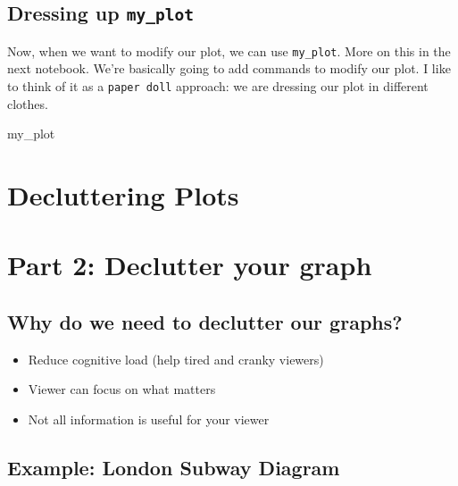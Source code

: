 \documentclass[
  letterpaper,
  DIV=11,
  numbers=noendperiod]{scrreprt}
\newenvironment{Shaded}{\begin{snugshade}}{\end{snugshade}}
\newcommand{\NormalTok}[1]{\textcolor[rgb]{0.00,0.23,0.31}{#1}}
\providecommand{\tightlist}{%
  \setlength{\itemsep}{0pt}\setlength{\parskip}{0pt}}\usepackage{longtable,booktabs,array}
\begin{document}
\section{\texorpdfstring{Dressing up
\texttt{my\_plot}}{Dressing up my\_plot}}\label{dressing-up-my_plot}

Now, when we want to modify our plot, we can use \texttt{my\_plot}. More
on this in the next notebook. We're basically going to add commands to
modify our plot. I like to think of it as a \texttt{paper\ doll}
approach: we are dressing our plot in different clothes.

\begin{Shaded}
\begin{Highlighting}[]
\NormalTok{my\_plot}
\end{Highlighting}
\end{Shaded}


\chapter{Decluttering Plots}\label{decluttering-plots}


\chapter{Part 2: Declutter your
graph}\label{part-2-declutter-your-graph}

\section{Why do we need to declutter our
graphs?}\label{why-do-we-need-to-declutter-our-graphs}

\begin{itemize}
\tightlist
\item
  Reduce cognitive load (help tired and cranky viewers)
\item
  Viewer can focus on what matters
\item
  Not all information is useful for your viewer
\end{itemize}

\section{Example: London Subway
Diagram}\label{example-london-subway-diagram}
\end{document}
